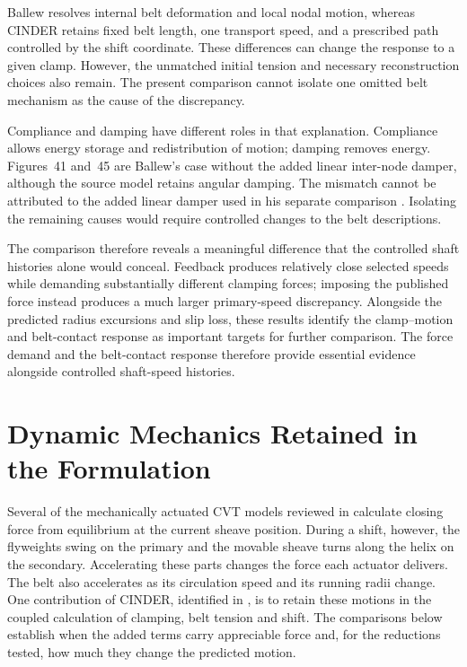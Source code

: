 \documentclass[11pt]{report}
\numberwithin{equation}{section}
\begin{document}
Ballew resolves internal belt deformation and local nodal motion,
whereas CINDER retains fixed belt length, one transport speed, and
a prescribed path controlled by the shift coordinate. These
differences can change the response to a given clamp. However,
the unmatched initial tension and necessary reconstruction choices
also remain. The present comparison cannot isolate one omitted belt
mechanism as the cause of the discrepancy.

\begin{samepage}
Compliance and damping have different roles in that explanation. Compliance
allows energy storage and redistribution of motion; damping removes energy.
Figures~41 and~45 are Ballew's case without the added linear inter-node damper,
although the source model retains angular damping. The mismatch cannot be
attributed to the added linear damper used in his separate comparison
\citep[Figures~40--45]{Ballew2015}. Isolating the remaining causes would require
controlled changes to the belt descriptions.
\end{samepage}

The comparison therefore reveals a meaningful difference that the
controlled shaft histories alone would conceal. Feedback produces
relatively close selected speeds while demanding substantially
different clamping forces; imposing the published force instead
produces a much larger primary-speed discrepancy. Alongside the
predicted radius excursions and slip loss, these results identify
the clamp--motion and belt-contact response as important targets
for further comparison. The force demand and the belt-contact response therefore provide
essential evidence alongside controlled shaft-speed histories.
\FloatBarrier

\section{Dynamic Mechanics Retained in the Formulation}
\label{sec:results_dynamic_mechanics}

Several of the mechanically actuated CVT models reviewed in
 calculate closing force from equilibrium at the
current sheave position. During a shift, however, the flyweights swing on
the primary and the movable sheave turns along the helix on the secondary.
Accelerating these parts changes the force each actuator delivers. The belt
also accelerates as its circulation speed and its running radii change.
One contribution of CINDER, identified in , is to
retain these motions in the coupled calculation of clamping, belt tension
and shift. The comparisons below establish when the added terms carry
appreciable force and, for the reductions tested, how much they change
the predicted motion.
\end{document}

